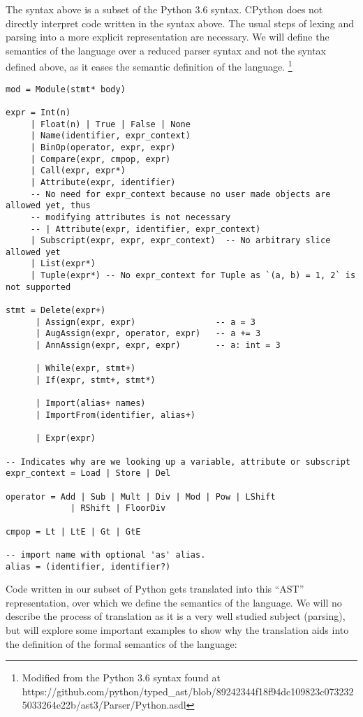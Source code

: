 The syntax above is a subset of the Python 3.6 syntax. CPython does not
directly interpret code written in the syntax above. The usual steps of
lexing and parsing into a more explicit representation are necessary. We
will define the semantics of the language over a reduced parser syntax
and not the syntax defined above, as it eases the semantic definition of
the language. \footnote{Modified from the Python 3.6 syntax found at
  https://github.com/python/typed\_ast/blob/89242344f18f94dc109823c0732325033264e22b/ast3/Parser/Python.asdl}

\begin{verbatim}
mod = Module(stmt* body)

expr = Int(n)
     | Float(n) | True | False | None
     | Name(identifier, expr_context)
     | BinOp(operator, expr, expr)
     | Compare(expr, cmpop, expr)
     | Call(expr, expr*)
     | Attribute(expr, identifier)
     -- No need for expr_context because no user made objects are allowed yet, thus
     -- modifying attributes is not necessary
     -- | Attribute(expr, identifier, expr_context)
     | Subscript(expr, expr, expr_context)  -- No arbitrary slice allowed yet
     | List(expr*)
     | Tuple(expr*) -- No expr_context for Tuple as `(a, b) = 1, 2` is not supported

stmt = Delete(expr+)
      | Assign(expr, expr)                -- a = 3
      | AugAssign(expr, operator, expr)   -- a += 3
      | AnnAssign(expr, expr, expr)       -- a: int = 3

      | While(expr, stmt+)
      | If(expr, stmt+, stmt*)

      | Import(alias+ names)
      | ImportFrom(identifier, alias+)

      | Expr(expr)

-- Indicates why are we looking up a variable, attribute or subscript
expr_context = Load | Store | Del

operator = Add | Sub | Mult | Div | Mod | Pow | LShift
             | RShift | FloorDiv

cmpop = Lt | LtE | Gt | GtE

-- import name with optional 'as' alias.
alias = (identifier, identifier?)
\end{verbatim}

Code written in our subset of Python gets translated into this
\enquote{AST} representation, over which we define the semantics of the
language. We will no describe the process of translation as it is a very
well studied subject (parsing), but will explore some important examples
to show why the translation aids into the definition of the formal
semantics of the language:

